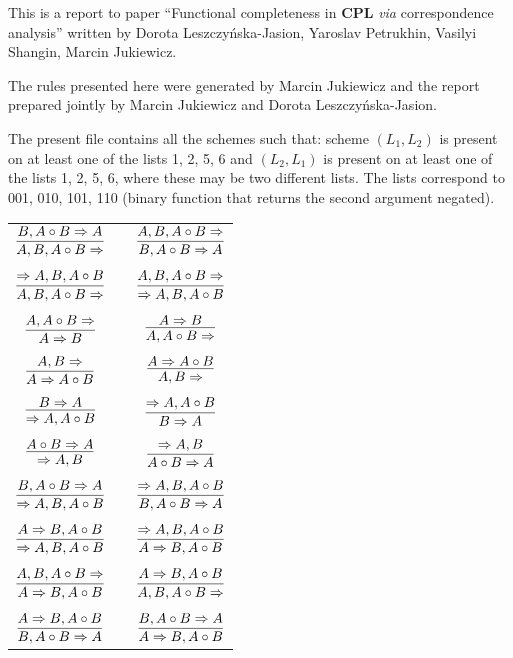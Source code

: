 \documentclass[11pt]{article}
\begin{document}
	
	This is a report to paper ``Functional completeness in \textbf{CPL} \textit{via} correspondence analysis'' written by Dorota Leszczy\'{n}ska-Jasion, 
	Yaroslav Petrukhin, Vasilyi Shangin, Marcin Jukiewicz. 
	
	The rules presented here were generated by Marcin Jukiewicz and the report prepared jointly by Marcin Jukiewicz and Dorota Leszczy\'{n}ska-Jasion.
	
	The present file contains all the schemes such that: scheme $(L_1, L_2)$ is present on at least one of the lists 1, 2, 5, 6 and $(L_2, L_1)$ is present on at least one of the lists 1, 2, 5, 6, where these may be two different lists. The lists correspond to 001, 010, 101, 110 (binary function that returns the second argument negated).
	
	\bigskip
	
\begin{center}

\begin{tabular}{ccc}
$\infer{A, B, A\circ B\Rightarrow }{B, A\circ B\Rightarrow A}$ && $\infer{B, A\circ B\Rightarrow A}{A, B, A\circ B\Rightarrow }$ \\
&& \\
$\infer{A, B, A\circ B\Rightarrow }{\Rightarrow A, B, A\circ B}$ && $\infer{\Rightarrow A, B, A\circ B}{A, B, A\circ B\Rightarrow }$ \\
&& \\
$\infer{A\Rightarrow B}{A, A\circ B\Rightarrow }$ && $\infer{A, A\circ B\Rightarrow }{A\Rightarrow B}$ \\
&& \\
$\infer{A\Rightarrow A\circ B}{A, B\Rightarrow }$ && $\infer{A, B\Rightarrow }{A\Rightarrow A\circ B}$ \\
&& \\
$\infer{\Rightarrow A, A\circ B}{B\Rightarrow A}$ && $\infer{B\Rightarrow A}{\Rightarrow A, A\circ B}$ \\
&& \\
$\infer{\Rightarrow A, B}{A\circ B\Rightarrow A}$ && $\infer{A\circ B\Rightarrow A}{\Rightarrow A, B}$ \\
&& \\
$\infer{\Rightarrow A, B, A\circ B}{B, A\circ B\Rightarrow A}$ && $\infer{B, A\circ B\Rightarrow A}{\Rightarrow A, B, A\circ B}$ \\
&& \\
$\infer{\Rightarrow A, B, A\circ B}{A\Rightarrow B, A\circ B}$ && $\infer{A\Rightarrow B, A\circ B}{\Rightarrow A, B, A\circ B}$ \\
&& \\
$\infer{A\Rightarrow B, A\circ B}{A, B, A\circ B\Rightarrow }$ && $\infer{A, B, A\circ B\Rightarrow }{A\Rightarrow B, A\circ B}$ \\
&& \\
$\infer{B, A\circ B\Rightarrow A}{A\Rightarrow B, A\circ B}$ && $\infer{A\Rightarrow B, A\circ B}{B, A\circ B\Rightarrow A}$ \\
\end{tabular}








\end{center}
\end{document}
